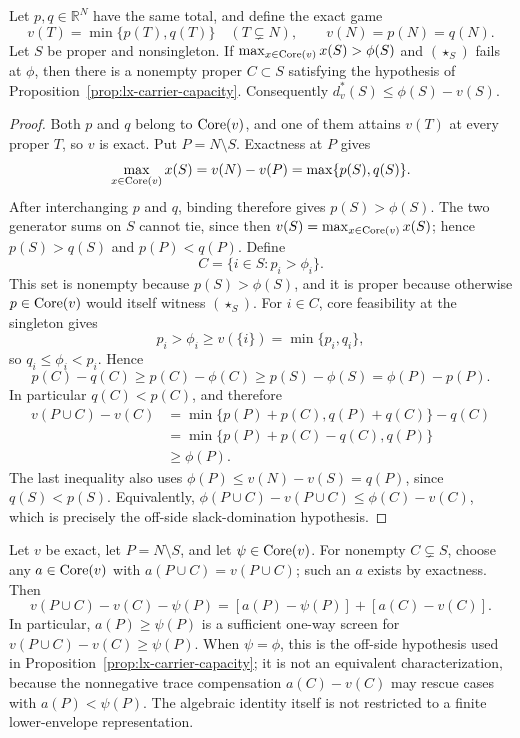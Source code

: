 \begin{proposition}
\label{prop:lx-two-generator}
Let $p,q\in\mathbb R^N$ have the same total, and define the exact game
\[
 v(T)=\min\{p(T),q(T)\}\quad(T\subsetneq N),
 \qquad v(N)=p(N)=q(N).
\]
Let $S$ be proper and nonsingleton.  If $\max_{x\in\operatorname{Core}(v)}x(S)>\phi(S)$ and
$(\star_S)$ fails at $\phi$, then there is a nonempty proper $C\subset S$
satisfying the hypothesis of
Proposition~\ref{prop:lx-carrier-capacity}.  Consequently
$d_v^*(S)\leq\phi(S)-v(S)$.
\end{proposition}

\begin{proof}
Both $p$ and $q$ belong to $\operatorname{Core}(v)$, and one of them attains $v(T)$ at
every proper $T$, so $v$ is exact.  Put $P=N\setminus S$.  Exactness at $P$ gives
\[
 \max_{x\in\operatorname{Core}(v)}x(S)=v(N)-v(P)=\max\{p(S),q(S)\}.
\]
After interchanging $p$ and $q$, binding therefore gives
$p(S)>\phi(S)$.  The two generator sums on $S$ cannot tie, since then
$v(S)=\max_{x\in\operatorname{Core}(v)}x(S)$; hence $p(S)>q(S)$ and $p(P)<q(P)$.  Define
\[
 C=\{i\in S:p_i>\phi_i\}.
\]
This set is nonempty because $p(S)>\phi(S)$, and it is proper because
otherwise $p\in\operatorname{Core}(v)$ would itself witness $(\star_S)$.  For $i\in C$,
core feasibility at the singleton gives
\[
 p_i>\phi_i\geq v(\{i\})=\min\{p_i,q_i\},
\]
so $q_i\leq\phi_i<p_i$.  Hence
\[
 p(C)-q(C)
 \geq p(C)-\phi(C)
 \geq p(S)-\phi(S)
 =\phi(P)-p(P).
\]
In particular $q(C)<p(C)$, and therefore
\[
 \begin{aligned}
 v(P\cup C)-v(C)
 &=\min\{p(P)+p(C),q(P)+q(C)\}-q(C)\\
 &=\min\{p(P)+p(C)-q(C),q(P)\}\\
 &\geq\phi(P).
 \end{aligned}
\]
The last inequality also uses
$\phi(P)\leq v(N)-v(S)=q(P)$, since $q(S)<p(S)$.
Equivalently,
$\phi(P\cup C)-v(P\cup C)\leq\phi(C)-v(C)$, which is precisely the
off-side slack-domination hypothesis.
\end{proof}

\begin{lemma}
\label{lem:lx-generator-compensation}
Let $v$ be exact, let $P=N\setminus S$, and let $\psi\in\operatorname{Core}(v)$.  For
nonempty $C\subsetneq S$, choose any $a\in\operatorname{Core}(v)$ with
$a(P\cup C)=v(P\cup C)$; such an $a$ exists by exactness.  Then
\[
 v(P\cup C)-v(C)-\psi(P)
 =[a(P)-\psi(P)]+[a(C)-v(C)].
 \tag{GC}\label{eq:lx-generator-compensation}
\]
In particular, $a(P)\geq\psi(P)$ is a sufficient one-way screen for
$v(P\cup C)-v(C)\geq\psi(P)$.  When $\psi=\phi$, this is the off-side
hypothesis used in Proposition~\ref{prop:lx-carrier-capacity}; it is not an
equivalent characterization, because the nonnegative trace compensation
$a(C)-v(C)$ may rescue cases with $a(P)<\psi(P)$.  The algebraic identity
itself is not restricted to a finite lower-envelope representation.
\end{lemma}

